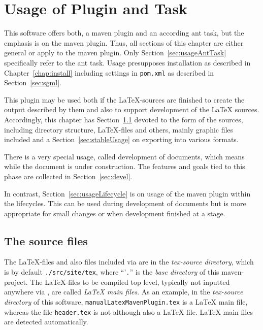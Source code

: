 
\chapter{Usage of Plugin and Task}\label{chap:usage}

This software offers both, a maven plugin and an according ant task,
but the emphasis is on the maven plugin.
Thus, all sections of this chapter are either general
or apply to the maven plugin.
Only Section~\ref{sec:usageAntTask} specifically refer to the ant task. 
Usage presupposes installation as described in Chapter~\ref{chap:install}
including settings in \texttt{pom.xml}
as described in Section~\ref{sec:sgml}.

This plugin may be used both if the \LaTeX-sources are finished 
to create the output described by them 
and also to support development of the \LaTeX{} sources. 
Accordingly, this chapter has Section~\ref{sec:sources}
devoted to the form of the sources, including directory structure,
\LaTeX-files and others, mainly graphic files included
and a Section~\ref{sec:stableUsage} on exporting into various formats.

There is a very special usage, called development of documents,
which means while the document is under construction.
The features and goals tied to this phase
are collected in Section~\ref{sec:devel}.

In contrast, Section~\ref{sec:usageLifecycle}
is on usage of the maven plugin within the lifecycles.
This can be used during development of documents
but is more appropriate for small changes
or when development finished at a stage. 



\section{The source files}\label{sec:sources}

The \LaTeX-files and also files included via  
are in the {\em tex-source directory}, 
which is by default \texttt{./src/site/tex}, 
where "`'\texttt{.}"' is the {\em base directory\/} of this maven-project. 
The \LaTeX-files to be compiled top level, 
typically not inputted anywhere via , 
are called {\em \LaTeX{} main files}. 
As an example, 
in the {\em tex-source directory\/} of this software, 
\texttt{manualLatexMavenPlugin.tex} is a \LaTeX{} main file, 
whereas the file \texttt{header.tex} is not although also a \LaTeX-file. 
\LaTeX{} main files are detected automatically. 

